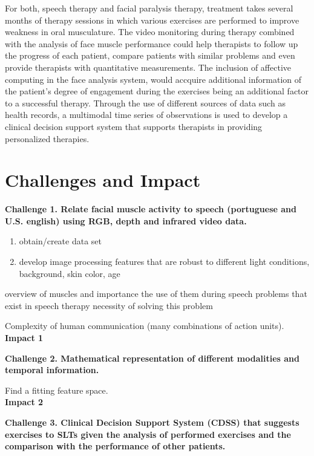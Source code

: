 For both, speech therapy and facial paralysis therapy, treatment takes several months of therapy sessions in which various exercises are performed to improve weakness in oral musculature. The video monitoring during therapy combined with the analysis of face muscle performance could help therapists to follow up the progress of each patient, compare patients with similar problems and even provide therapists with quantitative measurements. The inclusion of affective computing in the face analysis system, would accquire additional information of the patient's degree of engagement during the exercises being an additional factor to a successful therapy. Through the use of different sources of data such as health records, a multimodal time series of observations is used to develop a clinical decision support system that supports therapists in providing personalized therapies.

\section{Challenges and Impact}

\textbf{Challenge 1. Relate facial muscle activity to speech (portuguese and U.S. english) using RGB, depth and infrared video data.}

\begin{enumerate}
\item obtain/create data set
\item develop image processing features that are robust to different light conditions, background, skin color, age
\end{enumerate}


overview of muscles and importance
the use of them during speech
problems that exist in speech therapy
necessity of solving this problem

Complexity of human communication (many combinations of action units).\\


\textbf{Impact 1}


\textbf{Challenge 2. Mathematical representation of different modalities and temporal information.}

Find a fitting feature space. \\

\textbf{Impact 2}

\textbf{Challenge 3. Clinical Decision Support System (CDSS) that suggests exercises to SLTs given the analysis of performed exercises and the comparison with the performance of other patients.}

